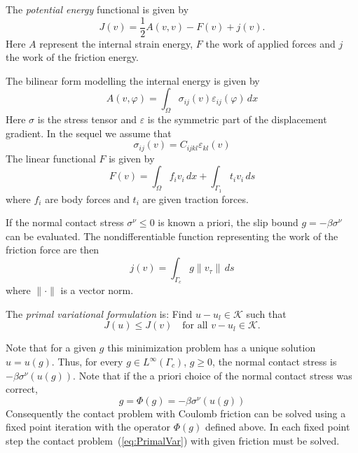 \documentclass[12pt,a4paper]{article}
\numberwithin{equation}{section}
\numberwithin{table}{section}
\numberwithin{figure}{section}
\newcommand{\half}{\ensuremath{\frac{1}{2}}}
\newcommand{\K}{\ensuremath{\mathcal{K}}}
\newcommand{\intO}{\int_\Omega\!\!}
\newcommand{\intG}[1][0]{\int_{\Gamma_{#1}}\!\!}
\newcommand{\intGc}{\intG[c]}
\renewcommand{\epsilon}{\varepsilon}
\renewcommand{\phi}{\varphi}
\newcommand{\strain}[1][]{\ensuremath{\epsilon_{#1}}}
\newcommand{\epsij}{\strain[ij]}
\newcommand{\epskl}{\strain[kl]}
\newcommand{\stress}[1][]{\ensuremath{\sigma_{#1}}}
\newcommand{\sigij}{\stress[ij]}
\providecommand{\norm}[1]{\lVert #1 \rVert}
\newcommand{\dx}{{\,dx}}
\newcommand{\ds}{{\,ds}}
\renewcommand{\forall}{\text{for all }}
\begin{document}
The \emph{potential energy} functional is given by
\begin{equation}
  \label{eq:PotentialEnergy}
  J(v) = \half A(v,v) - F(v) + j(v).
\end{equation}
Here $A$ represent the internal strain energy, $F$ the work of applied forces and $j$ the
work of the friction energy.

The bilinear form modelling the internal energy is given by
\begin{equation}
  \label{eq:InternalEnergy}
  A(v,\phi) = \intO \sigij(v) \epsij(\phi)\dx
\end{equation}
Here $\sigma$ is the stress tensor and $\epsilon$ is the symmetric part of the
displacement gradient.  In the sequel we assume that
\begin{equation}
  \label{eq:29}
  \sigij(v) = C_{ijkl}\epskl(v)
\end{equation}
The linear functional $F$ is given by
\begin{equation}
  \label{eq:30}
  F(v) = \intO f_i v_i \dx + \intG[1] t_i v_i \ds
\end{equation}
where $f_i$ are body forces and $t_i$ are given traction forces.

If the normal contact stress $\sigma^\nu\le 0$ is known a priori, the slip bound
$g=-\beta \sigma^\nu$ can be evaluated.  The nondifferentiable function representing the
work of the friction force are then
\begin{equation}
  \label{eq:FrictionWork}
  j(v) = \intGc g \norm{v_\tau} \ds
\end{equation}
where $\norm{\cdot}$ is a vector norm.

The \emph{primal variational formulation} is: Find $u-u_l\in\K$ such that
\begin{equation}
  \label{eq:PrimalVar}
  J(u) \le J(v) \quad\forall v-u_l\in \K.
\end{equation}

Note that for a given $g$ this minimization problem has a unique solution $u=u(g)$.  Thus,
for every $g\in L^\infty(\Gamma_c)$, $g\ge 0$, the normal contact stress is
$-\beta\sigma^\nu(u(g))$.  Note that if the a priori choice of the normal contact stress
was correct,
\begin{equation}
  \label{eq:12}
  g = \Phi(g) = -\beta\sigma^\nu(u(g))
\end{equation}
Consequently the contact problem with Coulomb friction can be solved using a fixed point
iteration with the operator $\Phi(g)$ defined above.  In each fixed point step the contact
problem~(\ref{eq:PrimalVar}) with given friction must be solved.
\end{document}
